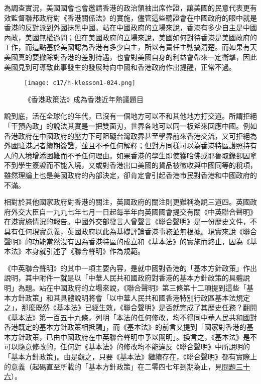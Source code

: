 為調查實況，美國國會也會邀請香港的政治領袖出席作證，讓美國的民意代表更有效監督聯邦政府對《香港關係法》的實施，儘管這些聽證會在中國政府的眼中就是香港的反對派到外國抹黑中國。站在中國政府的立場來說，香港有多少自主是中國內政，美國無權過問；但在美國政府的立場來說，美國如何對待香港是美國政府的工作，而這點基於美國認為香港有多少自主，所以有責任主動搞清楚。而如果有天美國真的要撤除對香港的差別待遇，也會對美國自身的利益會帶來一定衝擊，因此美國見到可導致此事發生的發展時向中國和香港政府作出提醒，正常不過。

\begin{figure}[htbp]
    \centering
    \texttt{[image: c17/h-klesson1-024.png]}
    \caption{《香港政策法》成為香港近年熱議題目} 
\end{figure}

說到底，活在全球化的年代，已沒有一個地方可以不和其他地方打交道。所謂拒絕「干預內政」的說法其實是一把雙面刃，世界各地可以同一板斧來回應中國。例如香港政府在中國政府的壓力下可阻礙台灣政界甚至學界前來香港交流，又可拒絕為外國駐港記者續期簽證，並且不予任何解釋；但對方同樣可以為香港特區護照持有人的入境增添困難而不予任何理由。如果香港的學生即使獲哈佛或耶魯取錄卻因拿不到學生簽證而不能入境，又或對香港出口美國的貨品被徵收與中國同等的稅項，雖然理論上也是美國政府的內部決定，卻肯定會引起香港市民對香港和中國政府的不滿。

相對於其他國家政府對香港的關注，英國政府的關注則更難稱為說三道四。英國政府外交大臣自一九九七年七月一日起每半年向英國國會提交有關《中英聯合聲明》在港實施情況的報告。中國外交部發言人曾聲言《聯合聲明》是一份歷史文件，不具有任何現實意義，英國政府以此為基礎評論香港事務並無根據。現實來說《聯合聲明》的功能當然沒有因為香港特區的成立和《基本法》的實施而終止，因為《基本法》本身就引述了《聯合聲明》作為規範。

《中英聯合聲明》的其中一項主要內容，是就中國對香港的「基本方針政策」作出說明，其中附件一就是以「中華人民共和國政府對香港的基本方針政策的具體說明」為題。站在中國政府的立場來說，《聯合聲明》第三條第十二項提到這些「基本方針政策」和其具體說明將會「以中華人民共和國香港特別行政區基本法規定之」，那麼既然《基本法》已經生效，《聯合聲明》是否就完成了其歷史任務？翻開《基本法》第一百五十九條，列明「本法的任何修改，均不得同中華人民共和國對香港既定的基本方針政策相抵觸」，而《基本法》的前言又提到「國家對香港的基本方針政策，已由中國政府在中英聯合聲明中予以闡明」。換言之，《基本法》是不可以隨意修改的，任何對《基本法》的修改均不能違反《聯合聲明》中所說明的「基本方針政策」。由是觀之，只要《基本法》繼續存在，《聯合聲明》都有實際上的意義（起碼直至所載的「基本方針政策」在二零四七年到期為止，見\hyperref[sec:sec36]{問題三十六}）。

